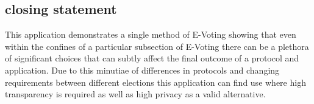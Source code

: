 \documentclass{entcs}
\begin{document}
\subsection{closing statement}
This application demonstrates a single method of E-Voting showing that even within the confines of a particular subsection of E-Voting there can be a plethora of significant choices that can subtly affect the final outcome of a protocol and application. Due to this minutiae of differences in protocols and changing requirements between different elections this application can find use where high transparency is required as well as high privacy as a valid alternative.

\printbibliography
\end{document}
